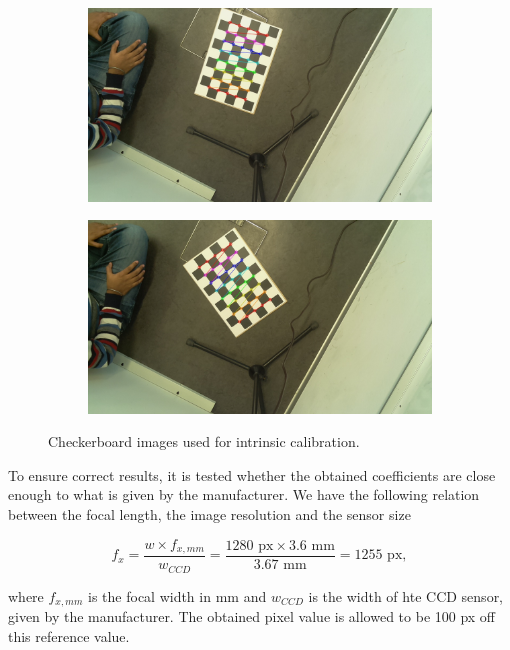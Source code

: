 \begin{figure}[H]
\begin{subfigure}{0.2\linewidth}
    \end{subfigure}
    \begin{subfigure}{0.2\linewidth}
        \includegraphics[width=\linewidth]{files/output145_7.jpg}
    \end{subfigure}
    \begin{subfigure}{0.2\linewidth}
        \includegraphics[width=\linewidth]{files/output145_8.jpg}
    \end{subfigure}
    \caption{Checkerboard images used for intrinsic calibration. }
    \label{fig:checkerboard}
\end{figure}

To ensure correct results, it is tested whether the obtained coefficients are close enough to what is given by the manufacturer. 
We have the following relation between the focal length, the image resolution and the sensor size

\begin{equation}
    f_x = \frac{w \times f_{x,mm}}{w_{CCD}} = \frac{1280\text{ px} \times 3.6\text{ mm}}{3.67\text{ mm}} = 1255 \text{ px},
\end{equation}

where $f_{x,mm}$ is the focal width in mm and $w_{CCD}$ is the width of hte CCD sensor, given by the manufacturer.
The obtained pixel value is allowed to be 100 px off this reference value.
